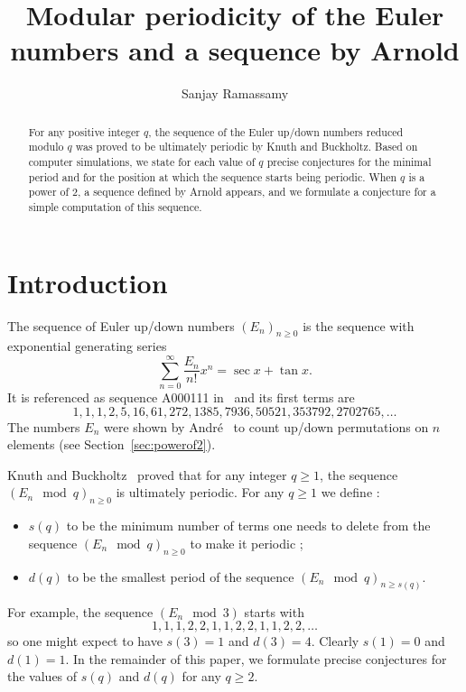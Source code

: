 \documentclass[12pt]{amsart}
\title{Modular periodicity of the Euler numbers and a sequence by Arnold}
\author{Sanjay Ramassamy}
\begin{document}
 


\maketitle



\begin{abstract}
For any positive integer $q$, the sequence of the Euler up/down numbers reduced modulo $q$ was proved to be ultimately periodic by Knuth and Buckholtz. Based on computer simulations, we state for each value of $q$ precise conjectures for the minimal period and for the position at which the sequence starts being periodic. When $q$ is a power of $2$, a sequence defined by Arnold appears, and we formulate a conjecture for a simple computation of this sequence.
\end{abstract}

\section{Introduction}
\label{sec:introduction}

The sequence of Euler up/down numbers $(E_n)_{n\geq0}$ is the sequence with exponential generating series
\begin{equation}
\sum_{n=0}^{\infty} \frac{E_n}{n!} x^n = \sec x + \tan x.
\end{equation}
It is referenced as sequence A000111 in~\cite{OEIS} and its first terms are
\[
1, 1, 1, 2, 5, 16, 61, 272, 1385, 7936, 50521, 353792, 2702765,\ldots
\]
The numbers $E_n$ were shown by Andr\'e~\cite{A79} to count up/down permutations on $n$ elements (see Section~\ref{sec:powerof2}). 


Knuth and Buckholtz~\cite{KB67} proved that for any integer $q\geq1$, the sequence $(E_n \mod q)_{n\geq 0}$ is ultimately periodic. For any $q \geq 1$ we define :
\begin{itemize}
 \item $s(q)$ to be the minimum number of terms one needs to delete from the sequence $(E_n \mod q)_{n \geq 0}$ to make it periodic ;
 \item $d(q)$ to be the smallest period of the sequence $(E_n \mod q)_{n \geq s(q)}$.
\end{itemize}
For example, the sequence $(E_n \mod 3)$ starts with
\[
1,1,1,2,2,1,1,2,2,1,1,2,2,\ldots
\]
so one might expect to have $s(3)=1$ and $d(3)=4$. Clearly $s(1)=0$ and $d(1)=1$. In the remainder of this paper, we formulate precise conjectures for the values of $s(q)$ and $d(q)$ for any $q\geq2$.
\end{document}
